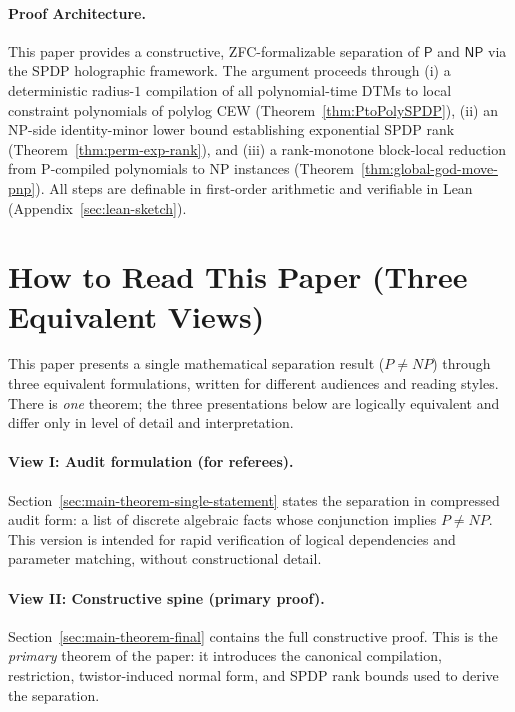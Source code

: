 \documentclass[12pt]{article}
\theoremstyle{definition}
\theoremstyle{definition}
\theoremstyle{remark}
\theoremstyle{remark}
\begin{document}
\paragraph{Proof Architecture.}
This paper provides a constructive, ZFC-formalizable separation of $\mathsf{P}$ and $\mathsf{NP}$ via the SPDP holographic framework. The argument proceeds through (i) a deterministic radius-$1$ compilation of all polynomial-time DTMs to local constraint polynomials of polylog CEW (Theorem~\ref{thm:PtoPolySPDP}), (ii) an NP-side identity-minor lower bound establishing exponential SPDP rank (Theorem~\ref{thm:perm-exp-rank}), and (iii) a rank-monotone block-local reduction from P-compiled polynomials to NP instances (Theorem~\ref{thm:global-god-move-pnp}). All steps are definable in first-order arithmetic and verifiable in Lean (Appendix~\ref{sec:lean-sketch}).

\tableofcontents

\section{How to Read This Paper (Three Equivalent Views)}
\label{sec:how-to-read-three}

This paper presents a single mathematical separation result ($P\neq NP$)
through three equivalent formulations, written for different audiences and
reading styles. There is \emph{one} theorem; the three presentations below are
logically equivalent and differ only in level of detail and interpretation.

\paragraph{View I: Audit formulation (for referees).}
Section~\ref{sec:main-theorem-single-statement} states the separation in compressed
audit form: a list of discrete algebraic facts whose conjunction implies
$P\neq NP$. This version is intended for rapid verification of logical
dependencies and parameter matching, without constructional detail.

\paragraph{View II: Constructive spine (primary proof).}
Section~\ref{sec:main-theorem-final} contains the full constructive proof.
This is the \emph{primary} theorem of the paper: it introduces the canonical
compilation, restriction, twistor-induced normal form, and SPDP rank bounds
used to derive the separation.
\end{document}
